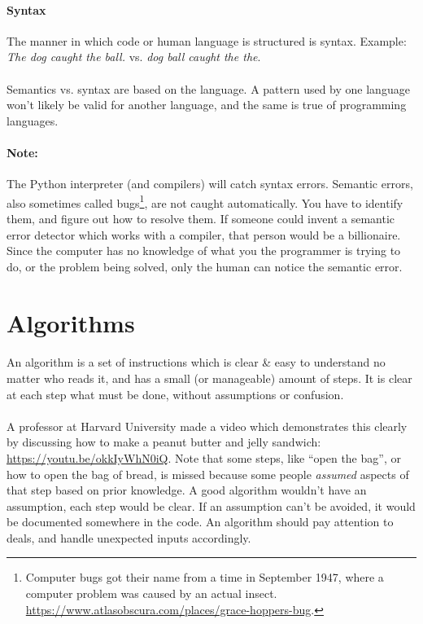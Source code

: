 \documentclass[letter,10pt]{article}
\begin{document}
\paragraph{Syntax} The manner in which code or human language is structured is syntax. Example: \textit{The dog caught the ball.} vs. \textit{dog ball caught the the}.

\paragraph{}Semantics vs. syntax are based on the language. A pattern used by one language won't likely be valid for another language, and the same is true of programming languages.

\paragraph{Note:}The Python interpreter (and compilers) will catch syntax errors. Semantic errors, also sometimes called bugs\footnote{Computer bugs got their name from a time in September 1947, where a computer problem was caused by an actual insect. \url{https://www.atlasobscura.com/places/grace-hoppers-bug}.}, are not caught automatically. You have to identify them, and figure out how to resolve them. If someone could invent a semantic error detector which works with a compiler, that person would be a billionaire. Since the computer has no knowledge of what you the programmer is trying to do, or the problem being solved, only the human can notice the semantic error.

\section{Algorithms}
\paragraph{}An algorithm is a set of instructions which is clear \& easy to understand no matter who reads it, and has a small (or manageable) amount of steps. It is clear at each step what must be done, without assumptions or confusion.

\paragraph{}A professor at Harvard University made a video which demonstrates this clearly by discussing how to make a peanut butter and jelly sandwich: \url{https://youtu.be/okkIyWhN0iQ}. Note that some steps, like ``open the bag'', or how to open the bag of bread, is missed because some people \textit{assumed} aspects of that step based on prior knowledge. A good algorithm wouldn't have an assumption, each step would be clear. If an assumption can't be avoided, it would be documented somewhere in the code. An algorithm should pay attention to deals, and handle unexpected inputs accordingly.
\end{document}
